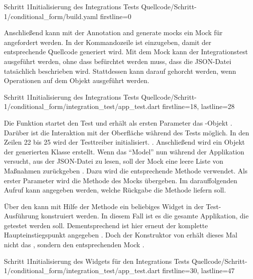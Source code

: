 \begin{alexyamllisting}{Schritt 1}{Initialisierung des Integrations Tests}
  {Quellcode/Schritt-1/conditional_form/build.yaml}
  {firstline=0}
  \label{lst:Schritt1IntegrationsTestInitialisierung}
\end{alexyamllisting}

Anschließend kann mit der Annotation and generate mocks  ein Mock für  angefordert werden.
In der Kommandozeile ist  einzugeben, damit der entsprechende Quellcode generiert wird.
Mit dem Mock kann der Integrationstest ausgeführt werden, ohne dass befürchtet werden muss, dass die JSON-Datei tatsächlich beschrieben wird.
Stattdessen kann darauf gehorcht werden, wenn Operationen auf dem Objekt ausgeführt werden. 

\begin{alexlisting}{Schritt 1}{Initialisierung des Integrations Tests}
  {Quellcode/Schritt-1/conditional_form/integration_test/app_test.dart}
  {firstline=18, lastline=28}
  \label{lst:Schritt1IntegrationsTestInitialisierung}
\end{alexlisting}

Die Funktion  startet den Test und erhält als ersten Parameter das -Objekt .
Darüber ist die Interaktion mit der Oberfläche während des Tests möglich.
In den Zeilen 22 bis 25 wird der Testtreiber initialisiert. . Anschließend wird ein Objekt der generierten Klasse  erstellt. Wenn das \enquote{Model} nun während der Applikation versucht, aus der JSON-Datei zu lesen, soll der Mock eine leere Liste von Maßnahmen zurückgeben . Dazu wird die entsprechende Methode  verwendet. Als erster Parameter wird die Methode  des Mocks übergeben. Im darauffolgenden Aufruf  kann angegeben werden, welche Rückgabe die Methode liefern soll.

Über den  kann mit Hilfe der Methode  ein beliebiges Widget in der Test-Ausführung konstruiert werden.
In diesem Fall ist es die gesamte Applikation, die getestet werden soll.
Dementsprechend ist  hier erneut der komplette Haupteinstiegspunkt angegeben \Lst{\ref{lst:Schritt1IntegrationsTestWidgetInitialisierung}}.
Doch der Konstruktor von  erhält dieses Mal nicht das , sondern den entsprechenden Mock . 

\begin{alexlisting}{Schritt 1}{Initialisierung des Widgets für den Integrations Tests}
  {Quellcode/Schritt-1/conditional_form/integration_test/app_test.dart}
  {firstline=30, lastline=47}
  \label{lst:Schritt1IntegrationsTestWidgetInitialisierung}
\end{alexlisting}



